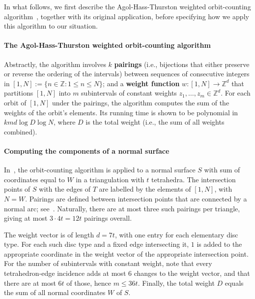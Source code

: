 \documentclass[a4paper,UKenglish,cleveref, autoref, thm-restate]{lipics-v2021}
\begin{document}
In what follows, we first describe the Agol-Hass-Thurston weighted orbit-counting algorithm~\cite{agol2006computational}, together with its original application, before specifying how we apply this algorithm to our situation.

\paragraph*{The Agol-Hass-Thurston weighted orbit-counting algorithm}

Abstractly, the algorithm involves $k$ \textbf{pairings} (i.e., bijections that either preserve or reverse the ordering of the intervals) between sequences of consecutive integers in $[1,N] := \{ n\in\mathbb{Z} : 1\leqslant n\leqslant N \}$;
and a \textbf{weight function} $w:[1,N]\to\mathbb{Z}^d$ that partitions $[1,N]$ into $m$ subintervals of constant weights $z_1,\ldots,z_m \in \mathbb{Z}^d$.
For each orbit of $[1,N]$ under the pairings, the algorithm computes the sum of the weights of the orbit's elements.
Its running time is shown to be polynomial in $kmd \log{D} \log{N}$, where $D$ is the total weight (i.e., the sum of all weights combined).

\paragraph*{Computing the components of a normal surface}

In~\cite{agol2006computational}, the orbit-counting algorithm is applied to a normal surface $S$ with sum of coordinates equal to $W$ in a triangulation with $t$ tetrahedra.
The intersection points of $S$ with the edges of $T$ are labelled by the elements of $[1,N]$, with $N=W$.
Pairings are defined between intersection points that are connected by a normal arc;
see~\cite[Figure~4]{agol2006computational}.
Naturally, there are at most three such pairings per triangle, giving at most $3\cdot 4t = 12 t$ pairings overall.

The weight vector is of length $d=7t$, with one entry for each elementary disc type.
For each such disc type and a fixed edge intersecting it, $1$ is added to the appropriate coordinate in the weight vector of the appropriate intersection point.
For the number of subintervals with constant weight, note that every tetrahedron-edge incidence adds at most $6$ changes to the weight vector, and that there are at most $6t$ of those, hence $m \leqslant 36t$.
Finally, the total weight $D$ equals the sum of all normal coordinates $W$ of $S$.
\end{document}
